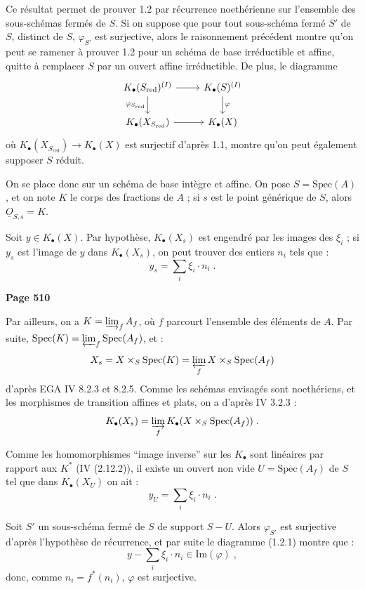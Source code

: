 Ce r\'esultat permet de prouver 1.2 par r\'ecurrence noeth\'erienne sur l'ensemble des sous-sch\'emas ferm\'es de $S$. Si on suppose que pour tout sous-sch\'ema ferm\'e $S'$ de $S$, distinct de $S$, $\varphi_{S'}$ est surjective, alors le raisonnement pr\'ec\'edent montre qu'on peut se ramener \`a prouver 1.2 pour un sch\'ema de base irr\'eductible et affine, quitte \`a remplacer $S$ par un ouvert affine irr\'eductible. De plus, le diagramme
\[
\begin{tikzcd}
K_\bullet(S_{\mathrm{red}})^{(I)} \arrow[r] \arrow[d, "\varphi_{S_{\mathrm{red}}}"'] &
K_\bullet(S)^{(I)} \arrow[d, "\varphi"] \\
K_\bullet(X_{S_{\mathrm{red}}}) \arrow[r] &
K_\bullet(X)
\end{tikzcd}
\]
o\`u $K_\bullet(X_{S_{\mathrm{red}}}) \longrightarrow K_\bullet(X)$ est surjectif d'apr\`es 1.1, montre qu'on peut \'egalement supposer $S$ r\'eduit.

On se place donc sur un sch\'ema de base int\`egre et affine. On pose $S = \mathrm{Spec}(A)$, et on note $K$ le corps des fractions de $A$ ; si $s$ est le point g\'en\'erique de $S$, alors $\underline{O}_{S,s} = K$.

Soit $y \in K_\bullet(X)$. Par hypoth\`ese, $K_\bullet(X_s)$ est engendr\'e par les images des $\xi_i$ ; si $y_s$ est l'image de $y$ dans $K_\bullet(X_s)$, on peut trouver des entiers $n_i$ tels que :
\[
y_s = \sum_i \xi_i \cdot n_i\;.
\]

\newpage
\noindent\textbf{Page 510}

Par ailleurs, on a $K = \varinjlim_f A_f$, o\`u $f$ parcourt l'ensemble des \'el\'ements de $A$. Par suite, $\mathrm{Spec}(K) = \varprojlim_f \mathrm{Spec}(A_f)$, et :
\[
X_s = X \times_S \mathrm{Spec}(K) = \varprojlim_f X \times_S \mathrm{Spec}(A_f)
\]
d'apr\`es EGA IV 8.2.3 et 8.2.5. Comme les sch\'emas envisag\'es sont noeth\'eriens, et les morphismes de transition affines et plats, on a d'apr\`es IV 3.2.3 :
\[
K_\bullet(X_s) = \varinjlim_f K_\bullet(X \times_S \mathrm{Spec}(A_f))\;.
\]

Comme les homomorphismes ``image inverse'' sur les $K_\bullet$ sont lin\'eaires par rapport aux $K^*$ (IV (2.12.2)), il existe un ouvert non vide $U = \mathrm{Spec}(A_f)$ de $S$ tel que dans $K_\bullet(X_U)$ on ait :
\[
y_U = \sum_i \xi_i \cdot n_i\;.
\]

Soit $S'$ un sous-sch\'ema ferm\'e de $S$ de support $S-U$. Alors $\varphi_{S'}$ est surjective d'apr\`es l'hypoth\`ese de r\'ecurrence, et par suite le diagramme (1.2.1) montre que :
\[
y - \sum_i \xi_i \cdot n_i \in \mathrm{Im}(\varphi)\;,
\]
donc, comme $n_i = f^*(n_i)$, $\varphi$ est surjective.

